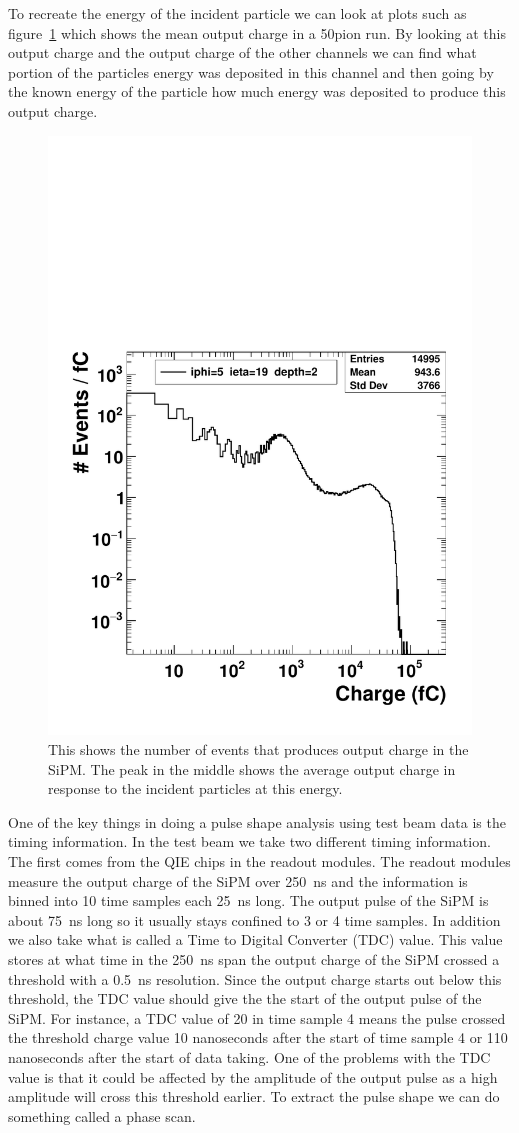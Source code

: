 To recreate the energy of the incident particle we can look at plots such as figure~\ref{fig:pioncharge} which shows the mean output charge in a 50\GeV pion run. By looking at this output charge and the output charge of the other channels we can find what portion of the particles energy was deposited in this channel and then going by the known energy of the particle how much energy was deposited to produce this output charge. 

\begin{figure}
\centering
\includegraphics[width=0.7\linewidth]{Figures/pioncharge.pdf}
\caption{This shows the number of events that produces output charge in the SiPM. The peak in the middle shows the average output charge in response to the incident particles at this energy.}
\label{fig:pioncharge}
\end{figure}

One of the key things in doing a pulse shape analysis using test beam data is the timing information. In the test beam we take two different timing information. The first comes from the QIE chips in the readout modules. The readout modules measure the output charge of the SiPM over 250~ns and the information is binned into 10 time samples each 25~ns long. The output pulse of the SiPM is about 75~ns long so it usually stays confined to 3 or 4 time samples. In addition we also take what is called a Time to Digital Converter (TDC) value. This value stores at what time in the 250~ns span the output charge of the SiPM crossed a threshold with a 0.5~ns resolution. Since the output charge starts out below this threshold, the TDC value should give the the start of the output pulse of the SiPM. For instance, a TDC value of 20 in time sample 4 means the pulse crossed the threshold charge value 10 nanoseconds after the start of time sample 4 or 110 nanoseconds after the start of data taking. One of the problems with the TDC value is that it could be affected by the amplitude of the output pulse as a high amplitude will cross this threshold earlier. To extract the pulse shape we can do something called a phase scan. 

